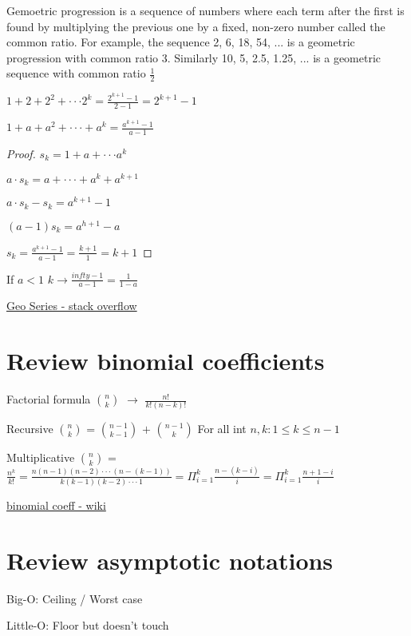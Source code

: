\documentclass[10 pt]{article}
\begin{document}
\begin{multicols}{2}
Gemoetric progression is a sequence of numbers where each term after the first is found by multiplying the previous one by a fixed, non-zero number called the common ratio. For example, the sequence 2, 6, 18, 54, ... is a geometric progression with common ratio 3. Similarly 10, 5, 2.5, 1.25, ... is a geometric sequence with common ratio $\frac{1}{2}$

$1 + 2 + 2^2 + \cdot \cdot \cdot 2^k = \frac{2^{k+1}-1}{2-1} = 2^{k+1}-1$

$1+a+a^2+ \cdot  \cdot  \cdot + a^k = \frac{a^{k+1}-1}{a-1}$

\begin{proof} 
$s_k=1+a+\cdot \cdot \cdot a^k$

$a \cdot  s_k=a+\cdot \cdot \cdot +a^k+a^{k+1}$

$a \cdot s_k -s_k = a^{k+1}-1$

$(a-1) s_k = a^{h+1} -a$

$s_k = \frac{a^{k+1}-1}{a-1} = \frac{k+1}{1} = k+1$
\end{proof}
If $a<1$ $k \rightarrow \frac{infty -1}{a-1} = \frac{1}{1-a}$

\href{http://stackoverflow.com/questions/2126031/converting-a-repeating-binary-number-to-decimal-express-as-a-series}{Geo Series - stack overflow}

\end{multicols}
\section{Review binomial coefficients}
Factorial formula
$n \choose k$ $\rightarrow$ $\frac{n!}{k!(n-k)!}$

Recursive
$n \choose k$ = $ {n-1} \choose {k-1}$ $+$ ${n-1} \choose k$ For all int $n,k:1 \leq k \leq n-1$

Multiplicative
$n \choose k$ = $\frac{n^k}{k!} = \frac{n(n-1)(n-2) \cdot \cdot \cdot (n-(k-1))}{k(k-1)(k-2)\cdot \cdot \cdot 1} = \Pi_{i=1}^k \frac{n-(k-i)}{i} = \Pi_{i=1}^k \frac{n+1-i}{i}$


\href{http://en.wikipedia.org/wiki/Binomial_coefficient}{binomial coeff - wiki}
\section{Review asymptotic notations}

Big-O: Ceiling / Worst case

Little-O: Floor but doesn't touch
\end{document}
